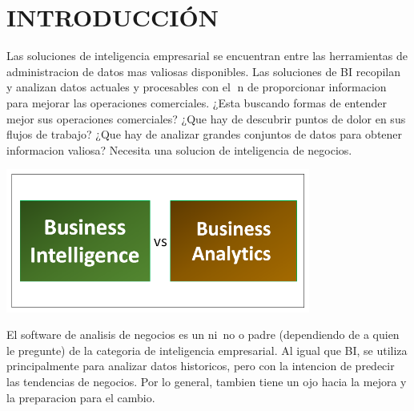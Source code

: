 \section{INTRODUCCIÓN} 
\begin{flushleft}

Las soluciones de inteligencia empresarial se encuentran entre las herramientas
de administracion de datos mas valiosas disponibles. Las soluciones de BI recopilan
y analizan datos actuales y procesables con el n de proporcionar informacion para
mejorar las operaciones comerciales. ¿Esta buscando formas de entender mejor sus
operaciones comerciales? ¿Que hay de descubrir puntos de dolor en sus flujos de
trabajo? ¿Que hay de analizar grandes conjuntos de datos para obtener informacion
valiosa? Necesita una solucion de inteligencia de negocios.

\begin{center}
\includegraphics[width=10cm]{./Imagenes/bivsba}
\end{center}
El software de analisis de negocios es un ni~no o padre (dependiendo de a quien le
pregunte) de la categoria de inteligencia empresarial. Al igual que BI, se utiliza
principalmente para analizar datos historicos, pero con la intencion de predecir las
tendencias de negocios. Por lo general, tambien tiene un ojo hacia la mejora y la
preparacion para el cambio.


\textbf{}\\
\textbf{}\\
\textbf{}\\






 

\end{flushleft}